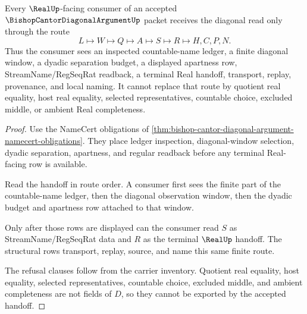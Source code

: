 \begin{theorem}
\label{thm:bishop-cantor-diagonal-argument-real-handoff}
Every $\RealUp$-facing consumer of an accepted $\BishopCantorDiagonalArgumentUp$ packet receives the diagonal read only through the route
$$
L \longmapsto W \longmapsto Q \longmapsto A \longmapsto S \longmapsto R \longmapsto H,C,P,N .
$$
Thus the consumer sees an inspected countable-name ledger, a finite diagonal window, a dyadic separation budget, a displayed apartness row, StreamName/RegSeqRat readback, a terminal Real handoff, transport, replay, provenance, and local naming. It cannot replace that route by quotient real equality, host real equality, selected representatives, countable choice, excluded middle, or ambient Real completeness.
\end{theorem}
\begin{proof}
Use the NameCert obligations of \autoref{thm:bishop-cantor-diagonal-argument-namecert-obligations}. They place ledger inspection, diagonal-window selection, dyadic separation, apartness, and regular readback before any terminal Real-facing row is available.

Read the handoff in route order. A consumer first sees the finite part of the countable-name ledger, then the diagonal observation window, then the dyadic budget and apartness row attached to that window.

Only after those rows are displayed can the consumer read $S$ as StreamName/RegSeqRat data and $R$ as the terminal $\RealUp$ handoff. The structural rows transport, replay, source, and name this same finite route.

The refusal clauses follow from the carrier inventory. Quotient real equality, host equality, selected representatives, countable choice, excluded middle, and ambient completeness are not fields of $D$, so they cannot be exported by the accepted handoff.
\end{proof}




